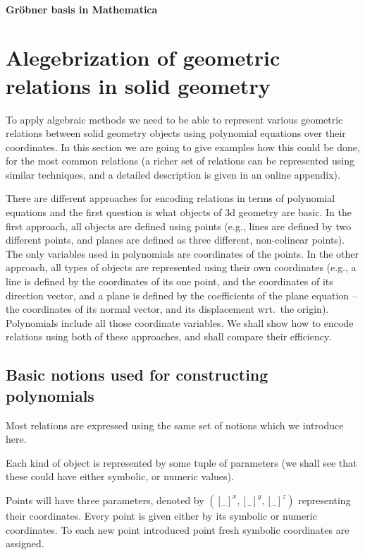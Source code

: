 \documentclass{aicom2e}
\begin{document}
\paragraph{Gr\"obner basis in Mathematica}

\section{Alegebrization of geometric relations in solid geometry}
\label{polynomials}
To apply algebraic methods we need to be able to represent various
geometric relations between solid geometry objects using polynomial
equations over their coordinates. In this section we are going to give
examples how this could be done, for the most common relations (a
richer set of relations can be represented using similar techniques,
and a detailed description is given in an online
appendix). %

There are different approaches for encoding relations in terms of
polynomial equations and the first question is what objects of 3d
geometry are basic. %
In the first approach, all objects are defined using points (e.g.,
lines are defined by two different points, and planes are defined as
three different, non-colinear points). The only variables used in
polynomials are coordinates of the points. In the other approach, all
types of objects are represented using their own coordinates (e.g., a
line is defined by the coordinates of its one point, and the
coordinates of its direction vector, and a plane is defined by the
coefficients of the plane equation -- the coordinates of its normal
vector, and its displacement wrt.~the origin). Polynomials include all
those coordinate variables. We shall show how to encode relations
using both of these approaches, and shall compare their efficiency.


\subsection{Basic notions used for constructing polynomials}
Most relations are expressed using the same set of notions which we
introduce here.

Each kind of object is represented by some tuple of parameters (we
shall see that these could have either symbolic, or numeric values).

Points will have three parameters, denoted by
$({[\_]}^x, {[\_]}^y, {[\_]}^z)$ representing their coordinates. Every
point is given either by its symbolic or numeric coordinates. To each
new point introduced point fresh symbolic coordinates are assigned.
\end{document}

